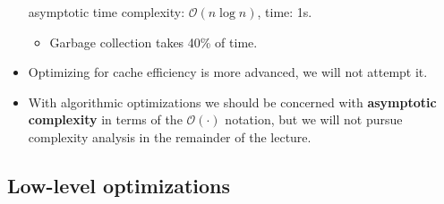 \documentclass{beamer}
\newcommand{\tmstrong}[1]{\textbf{#1}}
\newcommand{\tmverbatim}[1]{\text{{\ttfamily{#1}}}}
\begin{document}
\begin{itemize}
  {}{}{\hlopt{=}}{\hlendline{}}\\
  {\hlstd{ \ }}{}{}{\hlopt{=
  }}{}{}{}{}{}{}{}{\hlendline{}}\\
  {\hlstd{ \ }}{}{}{\hlopt{,}}{}{\hlopt{,}}{}{\hlopt{=
  }}{}{}{}{\hlopt{(}}{}{\hlopt{(}}{}{\hlopt{,}}{}{\hlopt{,}}{}{\hlopt{)
  }}{}{\hlopt{->}}{\hlendline{}}\\
  {\hlstd{ \ \ \ \ \ }}{}{}{\hlopt{= }}{}{}{}{\hlopt{,
  }}{}{\hlopt{+}}{}{\hlopt{, }}{}{}{}{\hlopt{, }}{}{\hlopt{,
  ((}}{}{\hlopt{,}}{}{\hlopt{)::}}{}{\hlopt{))}}{\hlendline{}}\\
  {\hlstd{ \ \ \ }}{\hlopt{(}}{}{\hlopt{, }}{}{\hlopt{, [])
  }}{}{}{\hlendline{}}\\
  {\hlstd{ \
  }}{\hlopt{(}}{}{\hlopt{,}}{}{\hlopt{)::}}{}{\hlendline{}}
  
  \tmverbatim{Optim2.ml} asymptotic time complexity: $\mathcal{O} (n \log n)$,
  time: 1s.
  \begin{itemize}
    \item Garbage collection takes 40\% of time. 
  \end{itemize}
  \item Optimizing for cache efficiency is more advanced, we will not attempt
  it.
  
  \item With algorithmic optimizations we should be concerned with
  {\tmstrong{asymptotic complexity}} in terms of the $\mathcal{O} (\cdot)$
  notation, but we will not pursue complexity analysis in the remainder of the
  lecture.
\end{itemize}

\subsection{Low-level optimizations}
\end{document}
